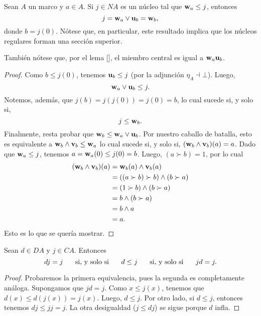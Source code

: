 \begin{lemma}
    Sean $A$ un marco y $a\in A$.
    Si $j\in NA$ es un núcleo tal que $\mathbf w_{a}\leq j$, entonces
    \[
        j = \mathbf w_{a} \vee\mathbf u_{b} = \mathbf w_{b}
    ,\]
    donde $b=j(0)$.
    Nótese que, en particular, este resultado implica que los núcleos
    regulares forman una sección superior.
    
    También nótese que, por el lema
    [],
    el miembro central es igual a $\mathbf w_{a}\mathbf u_{b}$.
\end{lemma}
\begin{proof}
    Como $b\leq j(0)$, tenemos
    $\mathbf u_{b}\leq j$ (por la adjunción $\eta_A\dashv \bot$).
    Luego,
    \[
        \mathbf w_{a}\vee\mathbf u_{b}\leq j
    .\]
    Notemos, además, que $j(b)=j(j(0))=j(0)=b$,
    lo cual sucede si, y solo si,
    \[
        j \leq \mathbf w_{b}
    .\]
    Finalmente, resta probar que
    $\mathbf w_{b}\leq \mathbf w_{a}\vee\mathbf u_{b}$.
    Por nuestro caballo de batalla,
    esto es equivalente a $\mathbf w_{b}\wedge\mathbf v_{b}\leq \mathbf w_{a}$
    lo cual sucede si, y solo si, $(\mathbf w_{b}\wedge\mathbf v_{b})(a)=a$.
    Dado que $\mathbf w_{a}\leq j$, tenemos
    $a=\mathbf w_{a}(0)\leq j(0)=b$.
    Luego, $(a\succ b)=1$, por lo cual
    \begin{align*}
        (\mathbf w_{b}\wedge\mathbf v_{b})(a)
        &= \mathbf w_{b}(a)\wedge \mathbf v_{b}(a) \\
        &= ((a\succ b)\succ b)\wedge (b\succ a) \\
        &= (1\succ b) \wedge (b\succ a)\\
        &= b \wedge (b\succ a) \\
        &= b\wedge a \\
        &= a.
    \end{align*}
    Esto es lo que se quería mostrar.
\end{proof}


\begin{lemma}
    Sean $d\in DA$ y $j\in CA$.
    Entonces
    \[
        dj=j \hspace{5mm}\text{ si, y solo si }\hspace{5mm} d\leq j \hspace{5mm}\text{ si, y solo si }\hspace{5mm} jd=j
    .\]
\end{lemma}
\begin{proof}
    Probaremos la primera equivalencia,
    pues la segunda es completamente análoga.
    Supongamos que $jd=j$.
    Como $x\leq j(x)$, tenemos que $d(x)\leq d(j(x))=j(x)$.
    Luego, $d\leq j$.
    Por otro lado, si $d\leq j$, entonces tenemos
    $dj\leq jj=j$.
    La otra desigualdad ($j\leq dj$) se sigue porque $d$ infla.
\end{proof}


